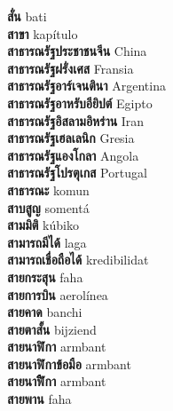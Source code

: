 \textbf{ สั่น  } bati \\
\textbf{ สาขา  } kapítulo \\
\textbf{ สาธารณรัฐประชาชนจีน  } China \\
\textbf{ สาธารณรัฐฝรั่งเศส  } Fransia \\
\textbf{ สาธารณรัฐอาร์เจนตินา  } Argentina \\
\textbf{ สาธารณรัฐอาหรับอียิปต์  } Egipto \\
\textbf{ สาธารณรัฐอิสลามอิหร่าน  } Iran \\
\textbf{ สาธารณรัฐเฮลเลนิก  } Gresia \\
\textbf{ สาธารณรัฐแองโกลา  } Angola \\
\textbf{ สาธารณรัฐโปรตุเกส  } Portugal \\
\textbf{ สาธารณะ  } komun \\
\textbf{ สาบสูญ  } somentá \\
\textbf{ สามมิติ  } kúbiko \\
\textbf{ สามารถมีได้  } laga \\
\textbf{ สามารถเชื่อถือได้  } kredibilidat \\
\textbf{ สายกระสุน  } faha \\
\textbf{ สายการบิน  } aerolínea \\
\textbf{ สายคาด  } banchi \\
\textbf{ สายตาสั้น  } bijziend \\
\textbf{ สายนาฬิกา  } armbant \\
\textbf{ สายนาฬิกาข้อมือ  } armbant \\
\textbf{ สายนาฬิืกา  } armbant \\
\textbf{ สายพาน  } faha \\
